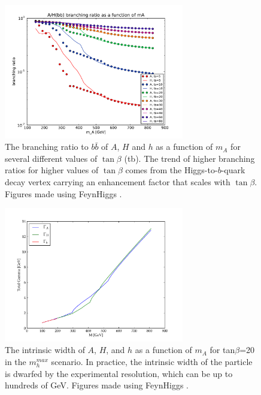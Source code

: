 \begin{figure}
	\centering
	\includegraphics[width=0.7\textwidth]{Theory/figures/mssm_xsec/AH_br_vs_mass.pdf}
	\caption{The branching ratio to $b\bar{b}$ of $A$, $H$ 
    and $h$ as a function of $m_A$ for 
    several different values of $\tan\beta$ (tb). The trend of higher branching 
    ratios for higher values of $\tan\beta$ comes from the Higgs-to-$b$-quark 
    decay vertex carrying an enhancement factor that scales with $\tan\beta$.
    Figures made using FeynHiggs \cite{feynhiggs_1, feynhiggs_2, feynhiggs_3, feynhiggs_4, feynhiggs_5}. 
    \label{fig:br_vs_mass} }
\end{figure}


\begin{figure}
	\centering
	\includegraphics[width=0.7\textwidth]{Theory/figures/gamma.pdf}
	\caption{The intrinsic width of $A$, $H$, and $h$ 
    as a function of $m_A$ for tan$\beta$=20 in the $m_h^{max}$ scenario.  
    In practice, the intrinsic width of the particle is dwarfed by the experimental 
    resolution, which can be up to hundreds of GeV.  
    Figures made using FeynHiggs \cite{feynhiggs_1, feynhiggs_2, feynhiggs_3, feynhiggs_4, feynhiggs_5}. \label{fig:width}}
\end{figure}



